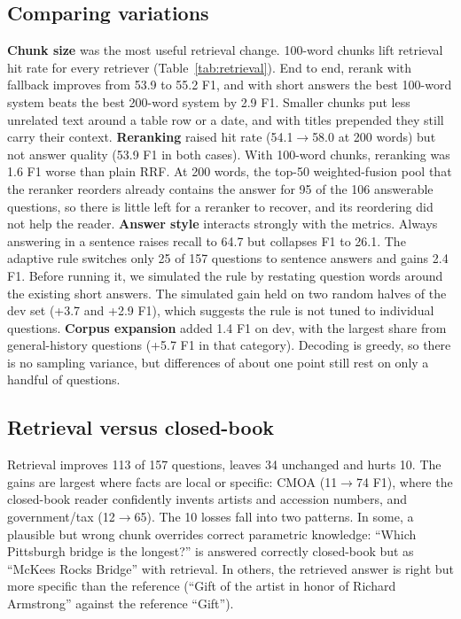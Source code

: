 \documentclass[11pt]{article}
\begin{document}
\subsection{Comparing variations}

\textbf{Chunk size} was the most useful retrieval change. 100-word chunks lift retrieval hit rate for every retriever (Table~\ref{tab:retrieval}). End to end, rerank with fallback improves from 53.9 to 55.2 F1, and with short answers the best 100-word system beats the best 200-word system by 2.9 F1. Smaller chunks put less unrelated text around a table row or a date, and with titles prepended they still carry their context.
\textbf{Reranking} raised hit rate (54.1$\rightarrow$58.0 at 200 words) but not answer quality (53.9 F1 in both cases). With 100-word chunks, reranking was 1.6 F1 worse than plain RRF. At 200 words, the top-50 weighted-fusion pool that the reranker reorders already contains the answer for 95 of the 106 answerable questions, so there is little left for a reranker to recover, and its reordering did not help the reader.
\textbf{Answer style} interacts strongly with the metrics. Always answering in a sentence raises recall to 64.7 but collapses F1 to 26.1. The adaptive rule switches only 25 of 157 questions to sentence answers and gains 2.4 F1. Before running it, we simulated the rule by restating question words around the existing short answers. The simulated gain held on two random halves of the dev set (+3.7 and +2.9 F1), which suggests the rule is not tuned to individual questions.
\textbf{Corpus expansion} added 1.4 F1 on dev, with the largest share from general-history questions (+5.7 F1 in that category). Decoding is greedy, so there is no sampling variance, but differences of about one point still rest on only a handful of questions.

\subsection{Retrieval versus closed-book}

Retrieval improves 113 of 157 questions, leaves 34 unchanged and hurts 10. The gains are largest where facts are local or specific: CMOA (11$\rightarrow$74 F1), where the closed-book reader confidently invents artists and accession numbers, and government/tax (12$\rightarrow$65). The 10 losses fall into two patterns. In some, a plausible but wrong chunk overrides correct parametric knowledge: ``Which Pittsburgh bridge is the longest?'' is answered correctly closed-book but as ``McKees Rocks Bridge'' with retrieval. In others, the retrieved answer is right but more specific than the reference (``Gift of the artist in honor of Richard Armstrong'' against the reference ``Gift'').
\end{document}
